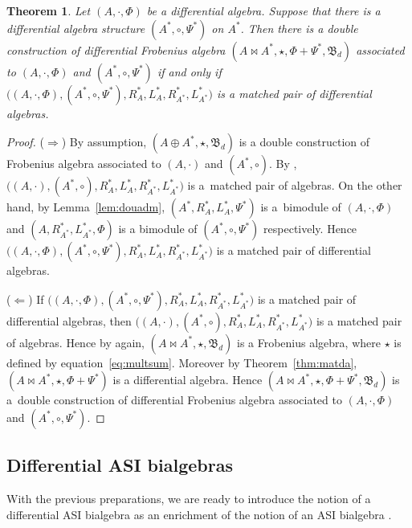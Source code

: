 \documentclass[pdftex]{sigma}
\numberwithin{equation}{section}
\newtheorem{Theorem}{Theorem}[section]
\begin{document}
\begin{Theorem}\label{thm:doumat}
 Let $(A, \cdot, \Phi)$ be a differential algebra.
 Suppose that there is a differential algebra structure $(A^*, \circ, \Psi^*)$ on $A^*$.
 Then there is a double construction of differential Frobenius algebra
 $(A \bowtie A^*, \star, \Phi + \Psi^*, \mathfrak{B}_d)$ associated to $(A, \cdot, \Phi)$ and $(A^*, \circ, \Psi^*)$ if and only if
 $\big((A, \cdot, \Phi), (A^*, \circ, \Psi^*), R^*_A, L^*_A, R^*_{A^*}, L^*_{A^*}\big)$ is a matched pair of differential algebras.
\end{Theorem}
\begin{proof}
 ($\Longrightarrow$)
 By assumption, $(A \oplus A^*, \star, \mathfrak{B}_d)$ is a double construction of Frobenius algebra associated to $(A,\cdot)$ and $(A^*, \circ)$.
 By \cite[Theorem~2.2.1]{BaiDouble}, $\big((A, \cdot), (A^*, \circ), R^*_A, L^*_A, R^*_{A^*}, L^*_{A^*}\big)$ is a~matched pair of algebras.
 On the other hand, by Lemma~\ref{lem:douadm}, $(A^*, R^*_A, L^*_A, \Psi^*)$ is a~bimodule of $(A, \cdot, \Phi)$ and
 $(A, R^*_{A^*}, L^*_{A^*}, \Phi)$ is a bimodule of $(A^*, \circ, \Psi^*)$ respectively.
 Hence $\big((A, \cdot, \Phi),\allowbreak (A^*, \circ, \Psi^*),R^*_A, L^*_A, R^*_{A^*}, L^*_{A^*}\big)$ is a matched pair of differential algebras.

 ($\Longleftarrow$)
 If $\big((A, \cdot, \Phi), (A^*, \circ, \Psi^*), R^*_A, L^*_A, R^*_{A^*}, L^*_{A^*}\big)$ is a matched pair of differential algebras,
 then $\big((A, \cdot), (A^*, \circ), R^*_A, L^*_A, R^*_{A^*}, L^*_{A^*}\big)$ is a matched pair of algebras.
 Hence by \cite[Theorem~2.2.1]{BaiDouble} again,
 $(A \bowtie A^*, \star, \mathfrak{B}_d)$ is a Frobenius algebra, where $\star$ is defined by equation~\eqref{eq:multsum}.
 Moreover by Theorem~\ref{thm:matda},
 $(A \bowtie A^*, \star, \Phi + \Psi^*)$ is a differential algebra.
 Hence $(A \bowtie A^*, \star, \Phi + \Psi^*, \mathfrak{B}_d)$ is a~double construction of differential Frobenius algebra associated to $(A, \cdot, \Phi)$ and $(A^*, \circ, \Psi^*)$.
\end{proof}

\subsection{Differential ASI bialgebras}\label{subsec:dasi}
With the previous preparations, we are ready to introduce the
notion of a differential ASI bialgebra as an enrichment of the
notion of an ASI bialgebra \cite{AguiarOn, BaiDouble, joni1979coalgebras, zhelyabian1997jordan}.
\end{document}
